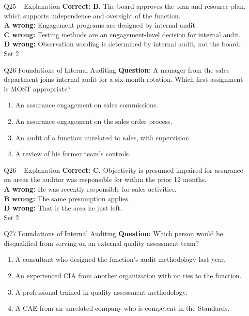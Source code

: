 \documentclass[aspectratio=169,10pt]{beamer}
\begin{document}
\begin{frame}[t]{Q25 -- Explanation}
	\footnotesize
	\textbf{Correct: B.} The board approves the plan and resource plan, which supports independence and oversight of the function. \\[5pt]
\textbf{A wrong:} Engagement programs are designed by internal audit. \\[3pt]
\textbf{C wrong:} Testing methods are an engagement-level decision for internal audit. \\[3pt]
\textbf{D wrong:} Observation wording is determined by internal audit, not the board. \\[3pt]
	\vfill {\tiny Set 2}
\end{frame}

\begin{frame}[t]{Q26 \hfill {\scriptsize Foundations of Internal Auditing}}
	\small
	\textbf{Question:} A manager from the sales department joins internal audit for a six-month rotation. Which first assignment is MOST appropriate?
	\begin{enumerate}[label=\Alph*.,itemsep=1pt,topsep=3pt]
			\item An assurance engagement on sales commissions.
			\item An assurance engagement on the sales order process.
			\item An audit of a function unrelated to sales, with supervision.
			\item A review of his former team's controls.
	\end{enumerate}
\end{frame}

\begin{frame}[t]{Q26 -- Explanation}
	\footnotesize
	\textbf{Correct: C.} Objectivity is presumed impaired for assurance on areas the auditor was responsible for within the prior 12 months. \\[5pt]
\textbf{A wrong:} He was recently responsible for sales activities. \\[3pt]
\textbf{B wrong:} The same presumption applies. \\[3pt]
\textbf{D wrong:} That is the area he just left. \\[3pt]
	\vfill {\tiny Set 2}
\end{frame}

\begin{frame}[t]{Q27 \hfill {\scriptsize Foundations of Internal Auditing}}
	\small
	\textbf{Question:} Which person would be disqualified from serving on an external quality assessment team?
	\begin{enumerate}[label=\Alph*.,itemsep=1pt,topsep=3pt]
			\item A consultant who designed the function's audit methodology last year.
			\item An experienced CIA from another organization with no ties to the function.
			\item A professional trained in quality assessment methodology.
			\item A CAE from an unrelated company who is competent in the Standards.
	\end{enumerate}
\end{frame}
\end{document}
